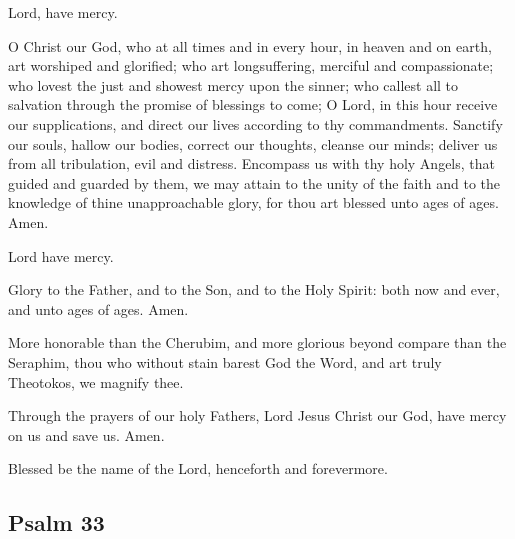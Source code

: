 Lord, have mercy. 

O Christ our God, who at all times and in every hour, in heaven and on earth, art worshiped and glorified; who art longsuffering, merciful and compassionate; who lovest the just and showest mercy upon the sinner; who callest all to salvation through the promise of blessings to come; O Lord, in this hour receive our supplications, and direct our lives according to thy commandments. Sanctify our souls, hallow our bodies, correct our thoughts, cleanse our minds; deliver us from all tribulation, evil and distress. Encompass us with thy holy Angels, that guided and guarded by them, we may attain to the unity of the faith and to the knowledge of thine unapproachable glory, for thou art blessed unto ages of ages. Amen.

Lord have mercy. 

Glory to the Father, and to the Son, and to the Holy Spirit: both now and ever, and unto ages of ages. Amen.

More honorable than the Cherubim, and more glorious beyond compare than the Seraphim, thou who without stain barest God the Word, and art truly Theotokos, we magnify thee.

Through the prayers of our holy Fathers, Lord Jesus Christ our God, have mercy on us and save us. Amen.

Blessed be the name of the Lord, henceforth and forevermore. 

\subsection{Psalm 33}

